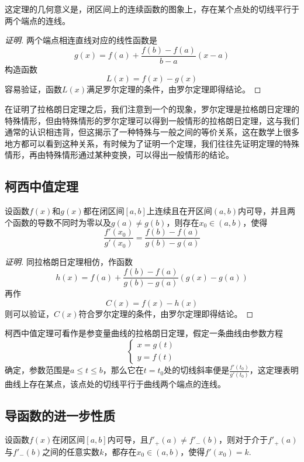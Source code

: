 这定理的几何意义是，闭区间上的连续函数的图象上，存在某个点处的切线平行于两个端点的连线。

\begin{proof}[证明]
  两个端点相连直线对应的线性函数是
  \[ g(x) = f(a) + \frac{f(b)-f(a)}{b-a}(x-a) \]
  构造函数
  \[ L(x) = f(x)-g(x) \]
  容易验证，函数$L(x)$满足罗尔定理的条件，由罗尔定理即得结论。
\end{proof}

在证明了拉格朗日定理之后，我们注意到一个的现象，罗尔定理是拉格朗日定理的特殊情形，但由特殊情形的罗尔定理可以得到一般情形的拉格朗日定理，这与我们通常的认识相违背，但这揭示了一种特殊与一般之间的等价关系，这在数学上很多地方都可以看到这种关系，有时候为了证明一个定理，我们往往先证明定理的特殊情形，再由特殊情形通过某种变换，可以得出一般情形的结论。

\subsection{柯西中值定理}
\label{sec:cauchy-middle-value-theorem}

\begin{theorem}
  设函数$f(x)$和$g(x)$都在闭区间$[a,b]$上连续且在开区间$(a,b)$内可导，并且两个函数的导数不同时为零以及$g(a) \neq g(b)$，则存在$x_0 \in (a,b)$，使得
  \[ \frac{f'(x_0)}{g'(x_0)} = \frac{f(b)-f(a)}{g(b)-g(a)} \]
\end{theorem}

\begin{proof}[证明]
  同拉格朗日定理相仿，作函数
  \[ h(x) = f(a) + \frac{f(b)-f(a)}{g(b)-g(a)}(g(x)-g(a)) \]
  再作
  \[ C(x) = f(x) - h(x) \]
  则可以验证，$C(x)$符合罗尔定理的条件，由罗尔定理即得结论。
\end{proof}

柯西中值定理可看作是参变量曲线的拉格朗日定理，假定一条曲线由参数方程
\[
  \begin{cases}
    x = g(t) \\
    y = f(t)
  \end{cases}
\]
确定，参数范围是$a \leqslant t \leqslant b$，那么它在$t=t_0$处的切线斜率便是$\frac{f'(t_0)}{g'(t_0)}$，这定理表明曲线上存在某点，该点处的切线平行于曲线两个端点的连线。

\subsection{导函数的进一步性质}
\label{sec:some-perproties-of-derivative-function}

\begin{theorem}[导函数介值定理]
  设函数$f(x)$在闭区间$[a,b]$内可导，且$f'_+(a) \neq f'_-(b)$，则对于介于$f'_+(a)$与$f'_-(b)$之间的任意实数$k$，都存在$x_0 \in (a,b)$，使得$ f'(x_0) = k $.
\end{theorem}

